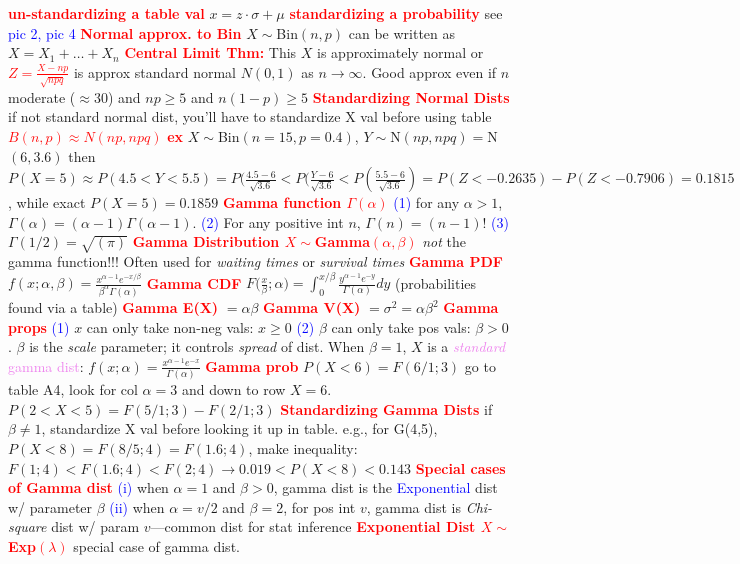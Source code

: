 \documentclass[10pt]{extarticle}
\newcommand{\re}[1]{\textcolor{red}{\textbf{#1}}}
\newcommand{\bt}[1]{\textcolor{blue}{#1}}
\newcommand{\pr}[1]{\textcolor{violet}{#1}}
\begin{document}
	\re{un-standardizing a table val} $x=z\cdot \sigma + \mu$
	\re{standardizing a probability} see \bt{pic 2, pic 4}
	\re{Normal approx. to Bin} $X\mathtt{\sim}$Bin$(n,p)$ can be written as
	$X=X_{1}+\ldots+X_{n}$
	\re{Central Limit Thm:} This $X$ is approximately normal or
	\re{$Z=\frac{X-np}{\sqrt{npq}}$} is approx standard normal $N(0,1)$ as
	$n\rightarrow\infty$. Good approx even if $n$ moderate ($\approx$30) and
	$np\geq5$ and $n(1-p)\geq 5$
	\re{Standardizing Normal Dists} if not standard normal dist, you'll have to
	standardize X val before using table
	\re{$B(n,p)\approx N(np,npq)$}
	\re{ex} $X\mathtt{\sim}$Bin$(n=15,p=0.4)$, $Y\mathtt{\sim}$N$(np,npq)=$N$(6,3.6)$
	then $P(X=5)\approx P(4.5<Y<5.5) =
	P(\frac{4.5-6}{\sqrt{3.6}} < P(\frac{Y-6}{\sqrt{3.6}}
							   < P(\frac{5.5-6}{\sqrt{3.6}})
							   		 = P(Z<-0.2635) - P(Z<-0.7906)
									 = 0.1815$, while exact $P(X=5)=0.1859$
	\re{Gamma function $\Gamma (\alpha)$}
	\bt{(1)} for any $\alpha>1$, $\Gamma (\alpha)
	= (\alpha - 1)\Gamma(\alpha - 1)$.
	\bt{(2)} For any positive int $n$, $\Gamma(n) = (n-1)!$
	\bt{(3)} $\Gamma(1/2) = \sqrt{(\pi)}$
	\re{Gamma Distribution $X\mathtt{\sim}$Gamma$(\alpha,\beta)$} \emph{not} the gamma
	function!!! Often used for \emph{waiting times} or \emph{survival times}
	\re{Gamma PDF} $f(x;\alpha,\beta)
					= \frac{x^{\alpha-1}e^{-x/\beta}}{\beta^{\alpha}\Gamma(\alpha)}$
	\re{Gamma CDF} $F\Big(\frac{x}{\beta}; \alpha\Big)
					 = \int_{0}^{x/\beta}\frac{y^{\alpha - 1}e^{-y}}{\Gamma(\alpha)}dy$
					 (probabilities found via a table)
	\re{Gamma E(X)} $=\alpha\beta$
	\re{Gamma V(X)} $=\sigma^{2}=\alpha\beta^{2}$
	\re{Gamma props}
	\bt{(1)} $x$ can only take non-neg vals: $x\geq 0$
	\bt{(2)} $\beta$ can only take pos vals: $\beta > 0$. $\beta$ is the \emph{scale}
	parameter; it controls \emph{spread} of dist. When $\beta=1$, $X$ is a
	\pr{\emph{standard} gamma dist}: $f(x;\alpha)=\frac{x^{\alpha-1}e^{-x}}{\Gamma(\alpha)}$
	\re{Gamma prob} $P(X<6)=F(6/1;3)$ go to table A4, look for col $\alpha=3$ and down
	to row $X=6$. $P(2<X<5)=F(5/1;3)-F(2/1;3)$
	\re{Standardizing Gamma Dists} if $\beta\neq 1$, standardize X val before looking
	it up in table. e.g., for G(4,5), $P(X<8) = F(8/5;4) = F(1.6;4)$, make
	inequality: $F(1;4) < F(1.6;4) < F(2;4) \rightarrow 0.019 < P(X<8) < 0.143$
	\re{Special cases of Gamma dist}
	\bt{(i)} when $\alpha=1$ and $\beta>0$, gamma dist is
	the \bt{Exponential} dist w/ parameter $\beta$
	\bt{(ii)} when $\alpha=v/2$ and $\beta=2$, for pos int $v$, gamma dist is
	\emph{Chi-square} dist w/ param $v$---common dist for stat inference
	\re{Exponential Dist $X\mathtt{\sim}$Exp$(\lambda)$} special case of gamma dist.
\end{document}
